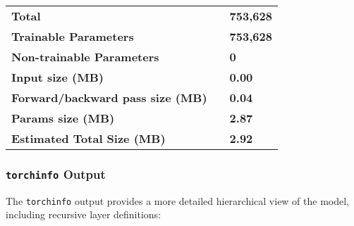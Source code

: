 \documentclass[10pt]{article}
\begin{document}
\begin{table}[H]
\begin{tabular}{@{}lll@{}}
\midrule
\textbf{Total}        &                       & \textbf{753,628}      \\
\textbf{Trainable Parameters} &               & \textbf{753,628}      \\
\textbf{Non-trainable Parameters} &           & \textbf{0}            \\
\textbf{Input size (MB)} &                   & \textbf{0.00}         \\
\textbf{Forward/backward pass size (MB)} &      & \textbf{0.04}         \\
\textbf{Params size (MB)} &                   & \textbf{2.87}         \\
\textbf{Estimated Total Size (MB)} &          & \textbf{2.92}         \\
\bottomrule
\end{tabular}
\label{tab:torchsummary}
\end{table}

\subsubsection{\texttt{torchinfo} Output}

The \texttt{torchinfo} output provides a more detailed hierarchical view of the model, including recursive layer definitions:
\end{document}
